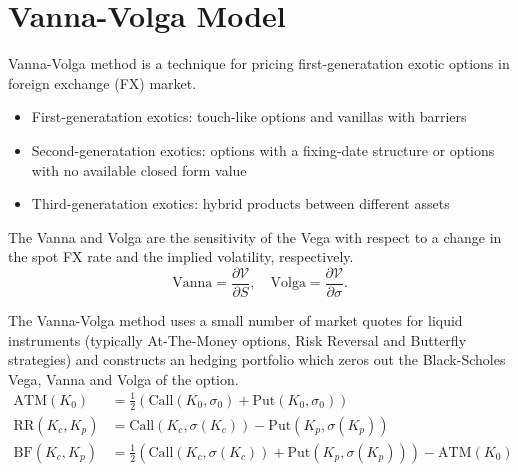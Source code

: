 \section{Vanna-Volga Model}
Vanna-Volga method is a technique for pricing first-generatation exotic options in foreign exchange (FX) market.
\begin{itemize}
    \setlength{\itemsep}{-6pt}
    \item First-generatation exotics: touch-like options and vanillas with barriers
    \item Second-generatation exotics: options with a fixing-date structure or options with no available closed form value
    \item Third-generatation exotics: hybrid products between different assets
\end{itemize}

The Vanna and Volga are the sensitivity of the Vega with respect to a change in the spot FX rate and the implied volatility, respectively.
\begin{equation}
    \mathrm{Vanna} = \frac{\partial \mathcal{V}}{\partial S}, \quad \mathrm{Volga} = \frac{\partial \mathcal{V}}{\partial \sigma}.
\end{equation}

The Vanna-Volga method uses a small number of market quotes for liquid instruments (typically At-The-Money options, Risk Reversal and Butterfly strategies) and constructs an hedging portfolio which zeros out the Black-Scholes Vega, Vanna and Volga of the option.
\begin{equation}
\begin{aligned}
    \mathrm{ATM}(K_0) &= \frac{1}{2}(\mathrm{Call}(K_0, \sigma_0) + \mathrm{Put}(K_0, \sigma_0)) \\
    \mathrm{RR}(K_c, K_p) &= \mathrm{Call}(K_c, \sigma(K_c)) - \mathrm{Put}(K_p, \sigma(K_p)) \\
    \mathrm{BF}(K_c, K_p) &= \frac{1}{2}(\mathrm{Call}(K_c, \sigma(K_c)) + \mathrm{Put}(K_p, \sigma(K_p))) - \mathrm{ATM}(K_0) \\
\end{aligned}
\end{equation}


